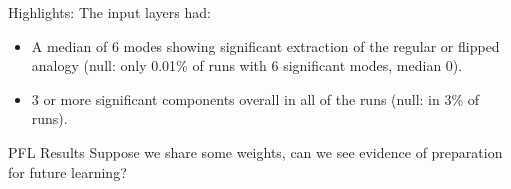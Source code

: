 \documentclass{beamer}
\begin{document}
\begin{frame}{Highlights:}
The input layers had:
\begin{itemize}
    \item<1-> A median of 6 modes showing significant extraction of the regular or flipped analogy (null: only 0.01\% of runs with 6 significant modes, median 0).
    \item<2-> 3 or more significant components overall in all of the runs (null: in 3\% of runs).
\end{itemize}
\end{frame}

\begin{frame}{PFL Results}
Suppose we share some weights, can we see evidence of preparation for future learning?\\[11pt]
\begin{columns}
\end{columns}
\end{frame}
\end{document}
